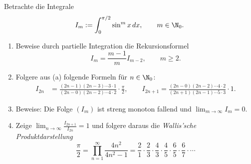 \begin{prob}
Betrachte die Integrale
$$
   I_m := \int_0^{\pi/2}\sin^mx\,dx,\qquad m\in\N_0.
$$
\begin{enumerate}[label=(\alph*)]
\item Beweise durch partielle Integration die Rekursionsformel
$$
   I_m = \frac{m-1}{m}I_{m-2},\qquad m\geq 2.
$$
\item Folgere aus (a) folgende Formeln f\"ur $n\in\N_0$:
\begin{align*}
   I_{2n} &= \frac{(2n-1)(2n-3)\cdots 3\cdot 1}{(2n-0)(2n-2)\cdots 4\cdot 2}\cdot\frac{\pi}{2},\qquad
   I_{2n+1} = \frac{(2n-0)(2n-2)\cdots 4\cdot 2}{(2n+1)(2n-1)\cdots 5\cdot 3}\cdot 1.
\end{align*}
\item Beweise: 
Die Folge $(I_m)$ ist streng monoton fallend und $\lim_{m\to\infty}I_m=0$.
\item Zeige $\lim_{n\to\infty}\frac{I_{2n+1}}{I_{2n}}=1$ und folgere
daraus die {\em Wallis'sche Produktdarstellung}
$$
   \frac{\pi}{2} = \prod_{n=1}^\infty \frac{4n^2}{4n^2-1} = \frac{2}{1} \cdot \frac{2}{3} \cdot \frac{4}{3} \cdot \frac{4}{5} \cdot \frac{6}{5} \cdot \frac{6}{7} \cdot \cdots
$$
\end{enumerate}
\end{prob}
